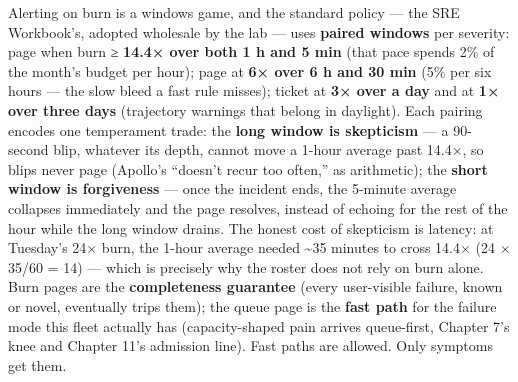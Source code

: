 Alerting on burn is a windows game, and the standard policy — the SRE Workbook’s, adopted wholesale by the lab — uses \textbf{paired windows} per severity: page when burn ≥ \textbf{14.4× over both 1 h and 5 min} (that pace spends 2\% of the month’s budget per hour); page at \textbf{6× over 6 h and 30 min} (5\% per six hours — the slow bleed a fast rule misses); ticket at \textbf{3× over a day} and at \textbf{1× over three days} (trajectory warnings that belong in daylight). Each pairing encodes one temperament trade: the \textbf{long window is skepticism} — a 90-second blip, whatever its depth, cannot move a 1-hour average past 14.4×, so blips never page (Apollo’s “doesn’t recur too often,” as arithmetic); the \textbf{short window is forgiveness} — once the incident ends, the 5-minute average collapses immediately and the page resolves, instead of echoing for the rest of the hour while the long window drains. The honest cost of skepticism is latency: at Tuesday’s 24× burn, the 1-hour average needed \textasciitilde{}35 minutes to cross 14.4× (24 × 35/60 = 14) — which is precisely why the roster does not rely on burn alone. Burn pages are the \textbf{completeness guarantee} (every user-visible failure, known or novel, eventually trips them); the queue page is the \textbf{fast path} for the failure mode this fleet actually has (capacity-shaped pain arrives queue-first, Chapter 7’s knee and Chapter 11’s admission line). Fast paths are allowed. Only symptoms get them.

